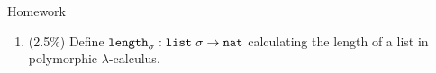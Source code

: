 %
%
%
%
%
%
%

\begin{frame}{Homework}
  \begin{enumerate}
    \item (2.5\%) Define $\mathtt{length}_\sigma : \mathtt{list}\;\sigma \to \mathtt{nat}$ calculating the length of a list in polymorphic $\lambda$-calculus.
    
  \end{enumerate}
  
\end{frame}

%
% 


